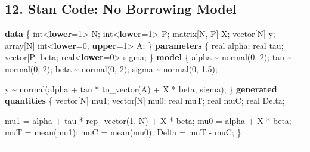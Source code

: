 \documentclass[
  letterpaper,
  DIV=11,
  numbers=noendperiod]{scrartcl}
\newenvironment{Shaded}{\begin{snugshade}}{\end{snugshade}}
\newcommand{\DataTypeTok}[1]{\textcolor[rgb]{0.68,0.00,0.00}{#1}}
\newcommand{\DecValTok}[1]{\textcolor[rgb]{0.68,0.00,0.00}{#1}}
\newcommand{\FloatTok}[1]{\textcolor[rgb]{0.68,0.00,0.00}{#1}}
\newcommand{\KeywordTok}[1]{\textcolor[rgb]{0.00,0.23,0.31}{\textbf{#1}}}
\newcommand{\NormalTok}[1]{\textcolor[rgb]{0.00,0.23,0.31}{#1}}
\begin{document}
\subsection{12. Stan Code: No Borrowing
Model}\label{stan-code-no-borrowing-model}

\begin{Shaded}
\begin{Highlighting}[]
\KeywordTok{data}\NormalTok{ \{}
  \DataTypeTok{int}\NormalTok{\textless{}}\KeywordTok{lower}\NormalTok{=}\DecValTok{1}\NormalTok{\textgreater{} N;}
  \DataTypeTok{int}\NormalTok{\textless{}}\KeywordTok{lower}\NormalTok{=}\DecValTok{1}\NormalTok{\textgreater{} P;}
  \DataTypeTok{matrix}\NormalTok{[N, P] X;}
  \DataTypeTok{vector}\NormalTok{[N] y;}
  \DataTypeTok{array}\NormalTok{[N] }\DataTypeTok{int}\NormalTok{\textless{}}\KeywordTok{lower}\NormalTok{=}\DecValTok{0}\NormalTok{, }\KeywordTok{upper}\NormalTok{=}\DecValTok{1}\NormalTok{\textgreater{} A;}
\NormalTok{\}}
\KeywordTok{parameters}\NormalTok{ \{}
  \DataTypeTok{real}\NormalTok{ alpha;}
  \DataTypeTok{real}\NormalTok{ tau;}
  \DataTypeTok{vector}\NormalTok{[P] beta;}
  \DataTypeTok{real}\NormalTok{\textless{}}\KeywordTok{lower}\NormalTok{=}\DecValTok{0}\NormalTok{\textgreater{} sigma;}
\NormalTok{\}}
\KeywordTok{model}\NormalTok{ \{}
\NormalTok{  alpha \textasciitilde{} normal(}\DecValTok{0}\NormalTok{, }\DecValTok{2}\NormalTok{);}
\NormalTok{  tau   \textasciitilde{} normal(}\DecValTok{0}\NormalTok{, }\DecValTok{2}\NormalTok{);}
\NormalTok{  beta  \textasciitilde{} normal(}\DecValTok{0}\NormalTok{, }\DecValTok{2}\NormalTok{);}
\NormalTok{  sigma \textasciitilde{} normal(}\DecValTok{0}\NormalTok{, }\FloatTok{1.5}\NormalTok{);}

\NormalTok{  y \textasciitilde{} normal(alpha + tau * to\_vector(A) + X * beta, sigma);}
\NormalTok{\}}
\KeywordTok{generated quantities}\NormalTok{ \{}
  \DataTypeTok{vector}\NormalTok{[N] mu1;}
  \DataTypeTok{vector}\NormalTok{[N] mu0;}
  \DataTypeTok{real}\NormalTok{ muT;}
  \DataTypeTok{real}\NormalTok{ muC;}
  \DataTypeTok{real}\NormalTok{ Delta;}

\NormalTok{  mu1 = alpha + tau * rep\_vector(}\DecValTok{1}\NormalTok{, N) + X * beta;}
\NormalTok{  mu0 = alpha + X * beta;}
\NormalTok{  muT = mean(mu1);}
\NormalTok{  muC = mean(mu0);}
\NormalTok{  Delta = muT {-} muC;}
\NormalTok{\}}
\end{Highlighting}
\end{Shaded}

\begin{center}\rule{0.5\linewidth}{0.5pt}\end{center}
\end{document}
